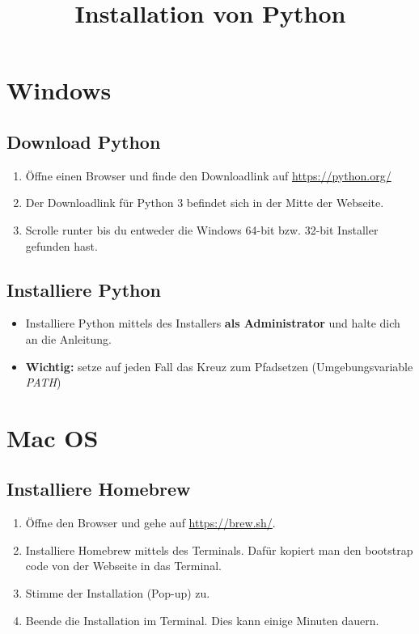 \documentclass[accentcolor=tud3c,colorbacktitle,12pt]{tudexercise}
\title{Installation von Python}
\subtitle{\Author}
\begin{document}
\maketitle



\section*{Windows}
\subsection*{Download Python}
\begin{enumerate}
	\item Öffne einen Browser und finde den Downloadlink auf \url{https://python.org/}
	\item Der Downloadlink für Python 3 befindet sich in der Mitte der Webseite.
	\item Scrolle runter bis du entweder die Windows 64-bit bzw. 32-bit Installer gefunden hast.
\end{enumerate}
\subsection*{Installiere Python}
\begin{itemize}
	\item Installiere Python mittels des Installers \textbf{als Administrator} und halte dich an die Anleitung. 
	\item \textbf{Wichtig:} setze auf jeden Fall das Kreuz zum Pfadsetzen (Umgebungsvariable \emph{PATH})
\end{itemize}

\section*{Mac OS}
\subsection*{Installiere Homebrew}
\begin{enumerate}
	\item Öffne den Browser und gehe auf \url{https://brew.sh/}. \item Installiere Homebrew mittels des Terminals. Dafür kopiert man den bootstrap code von der Webseite in das Terminal.
	\item Stimme der Installation (Pop-up) zu.
	\item Beende die Installation im Terminal. Dies kann einige Minuten dauern.
\end{enumerate}
\end{document}
